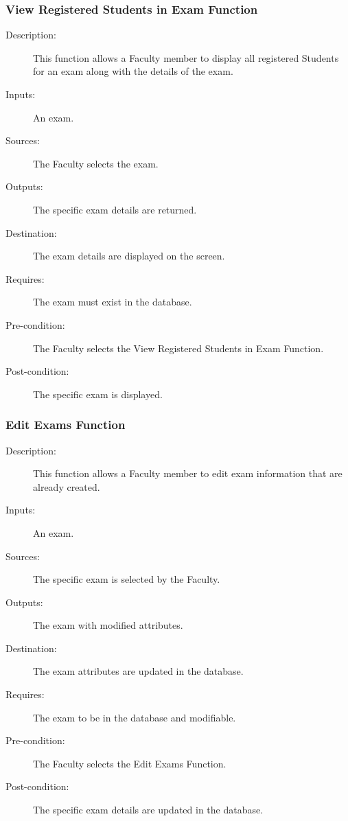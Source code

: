 \subsubsection{\large View Registered Students in Exam Function} 
\begin{boxed} %
\begin{description}
\item[Description:]
   This function allows a Faculty member to display all registered Students for
   an exam along with the details of the exam.
\item[Inputs:]
   An exam.
\item[Sources:]
   The Faculty selects the exam.
\item[Outputs:]
   The specific exam details are returned.
\item[Destination:]
   The exam details are displayed on the screen.
\item[Requires:]
   The exam must exist in the database.
\item[Pre-condition:]
   The Faculty selects the View Registered Students in Exam Function.
\item[Post-condition:]
   The specific exam is displayed.
\end{description}
\end{boxed} %

\subsubsection{\large Edit Exams Function} 
\begin{boxed} %
\begin{description}
\item[Description:]
   This function allows a Faculty member to edit exam information that are
   already created.
\item[Inputs:]
   An exam.
\item[Sources:]
   The specific exam is selected by the Faculty.
\item[Outputs:]
   The exam with modified attributes.
\item[Destination:]
   The exam attributes are updated in the database.
\item[Requires:]
   The exam to be in the database and modifiable.
\item[Pre-condition:]
   The Faculty selects the Edit Exams Function.
\item[Post-condition:]
   The specific exam details are updated in the database.
\end{description}
\end{boxed} %

